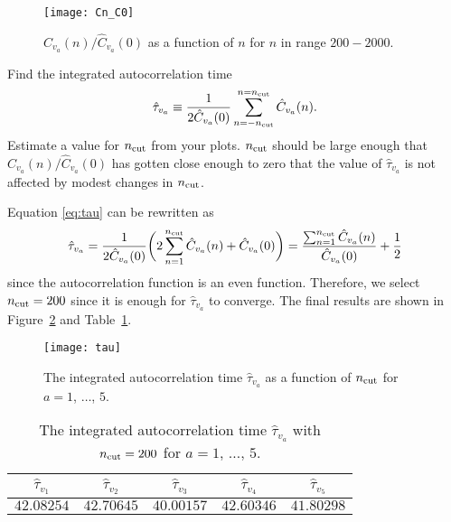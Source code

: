 \begin{figure}[h]
    \centering
    \texttt{[image: Cn\_C0]}
    \caption{\(\hat{C}_{v_a}(n) / \hat{C}_{v_a}(0)\) as a function of \(n\)
        for \(n\) in range \(200 - 2000\).}
    \label{fig:truecorlarge}
\end{figure}


\Question{} Find the integrated autocorrelation time
%
\begin{equation}\label{eq:tau}
    \hat{\tau}_{v_a} \equiv \frac{ 1 }{ 2 \hat{C}_{v_a}(0) }
    \sum_{n=-n_\textnormal{cut}}^{n=n_\textnormal{cut}} \hat{C}_{v_a}(n).
\end{equation}
%
Estimate a value for \(n_\textnormal{cut}\) from your plots.
\(n_\textnormal{cut}\) should be large enough that \(\hat{C}_{v_a}(n) / \hat{C}_{v_a}(0)\)
has gotten close enough to zero that the value of \(\hat{\tau}_{v_a}\)
is not affected by modest changes in \(n_\textnormal{cut}\).

\Answer{}
Equation \eqref{eq:tau} can be rewritten as
%
\begin{equation}
    \hat{\tau}_{v_a} = \frac{ 1 }{ 2 \hat{C}_{v_a}(0) }
    \biggl( 2\sum_{n=1}^{n_\textnormal{cut}} \hat{C}_{v_a}(n) + \hat{C}_{v_a}(0) \biggr)
    = \frac{ \sum_{n=1}^{n_\textnormal{cut}} \hat{C}_{v_a}(n) }{ \hat{C}_{v_a}(0) }
    + \frac{ 1 }{ 2 }
\end{equation}
%
since the autocorrelation function is an even function.
Therefore, we select \(n_\textnormal{cut} = 200\) since it is enough for \(\hat{\tau}_{v_a}\)
to converge.
The final results are shown in Figure~\ref{fig:tau} and Table~\ref{tab:tau}.

\begin{figure}[h]
    \centering
    \texttt{[image: tau]}
    \caption{The integrated autocorrelation time \(\hat{\tau}_{v_a}\) as a
        function of \(n_\textnormal{cut}\) for \(a = 1\), \(\ldots\), \(5\).}
    \label{fig:tau}
\end{figure}

\begin{table}
    \centering
    \caption{The integrated autocorrelation time \(\hat{\tau}_{v_a}\) with
        \(n_\textnormal{cut} = 200\) for \(a = 1\), \(\ldots\), \(5\).}
    \label{tab:tau}
    \begin{tabular}{@{}ccccc@{}}
        \toprule
        \(\hat{\tau}_{v_1}\) & \(\hat{\tau}_{v_2}\) & \(\hat{\tau}_{v_3}\) & \(\hat{\tau}_{v_4}\) & \(\hat{\tau}_{v_5}\) \\
        \midrule
        \(42.08254\)         & \(42.70645\)         & \(40.00157\)         & \(42.60346\)         & \(41.80298\)         \\
        \bottomrule
    \end{tabular}
\end{table}


